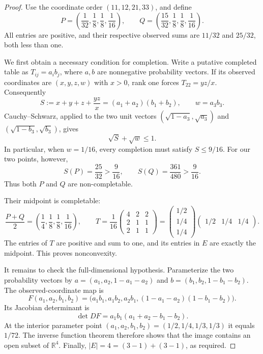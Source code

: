 \documentclass[11pt]{article}
\begin{document}
\begin{proof}
Use the coordinate order $(11,12,21,33)$, and define
\[
 P=\left(\frac1{32},\frac18,\frac18,\frac1{16}\right),
 \qquad
 Q=\left(\frac{15}{32},\frac18,\frac18,\frac1{16}\right).
\]
All entries are positive, and their respective observed sums are
$11/32$ and $25/32$, both less than one.

We first obtain a necessary condition for completion. Write a putative
completed table as $T_{ij}=a_i b_j$, where $a,b$ are nonnegative
probability vectors. If its observed coordinates are $(x,y,z,w)$
with $x>0$, rank one forces $T_{22}=yz/x$. Consequently
\[
 S:=x+y+z+\frac{yz}{x}=(a_1+a_2)(b_1+b_2),
 \qquad w=a_3b_3.
\]
Cauchy--Schwarz, applied to the two unit vectors
$(\sqrt{1-a_3},\sqrt{a_3})$ and
$(\sqrt{1-b_3},\sqrt{b_3})$, gives
\[
 \sqrt S+\sqrt w\leq1.
\]
In particular, when $w=1/16$, every completion must satisfy
$S\leq9/16$. For our two points, however,
\[
 S(P)=\frac{25}{32}>\frac9{16},
 \qquad
 S(Q)=\frac{361}{480}>\frac9{16}.
\]
Thus both $P$ and $Q$ are non-completable.

Their midpoint is completable:
\[
 \frac{P+Q}{2}
 =\left(\frac14,\frac18,\frac18,\frac1{16}\right),
 \qquad
 T=\frac1{16}
 \begin{pmatrix}
 4&2&2\\2&1&1\\2&1&1
 \end{pmatrix}
 =
 \begin{pmatrix}1/2\\1/4\\1/4\end{pmatrix}
 \begin{pmatrix}1/2&1/4&1/4\end{pmatrix}.
\]
The entries of $T$ are positive and sum to one, and its entries in
$E$ are exactly the midpoint. This proves nonconvexity.

It remains to check the full-dimensional hypothesis.
Parameterize the two probability vectors by
$a=(a_1,a_2,1-a_1-a_2)$ and
$b=(b_1,b_2,1-b_1-b_2)$. The observed-coordinate map is
\[
 F(a_1,a_2,b_1,b_2)=
 \bigl(a_1b_1,a_1b_2,a_2b_1,
       (1-a_1-a_2)(1-b_1-b_2)\bigr).
\]
Its Jacobian determinant is
\[
 \det DF=a_1b_1(a_1+a_2-b_1-b_2).
\]
At the interior parameter point
$(a_1,a_2,b_1,b_2)=(1/2,1/4,1/3,1/3)$ it equals $1/72$.
The inverse function theorem therefore shows that the image contains
an open subset of $\mathbb R^4$. Finally,
$|E|=4=(3-1)+(3-1)$, as required.
\end{proof}
\end{document}
